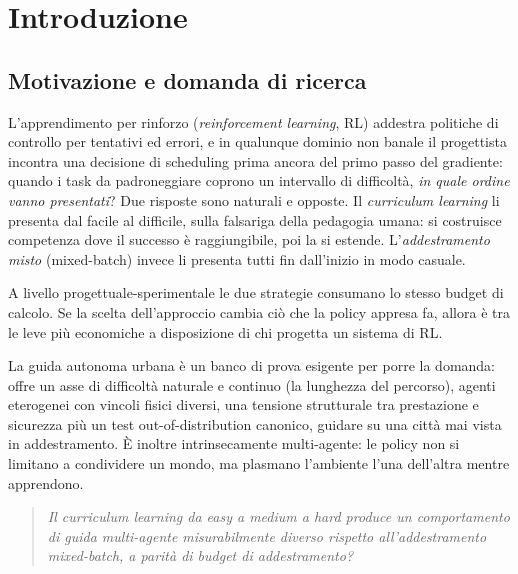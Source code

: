 \chapter{Introduzione}
\label{ch:intro}

\section{Motivazione e domanda di ricerca}
\label{sec:motivazione}

L'apprendimento per rinforzo (\emph{reinforcement learning}, RL)
addestra politiche di controllo per tentativi ed errori, e in qualunque
dominio non banale il progettista incontra una decisione di scheduling
prima ancora del primo passo del gradiente: quando i task da padroneggiare
coprono un intervallo di difficoltà, \emph{in quale ordine vanno
presentati}? Due risposte sono naturali e opposte. Il \emph{curriculum
learning} li presenta dal facile al difficile, sulla falsariga della
pedagogia umana: si costruisce competenza dove il successo è
raggiungibile, poi la si estende. L'\emph{addestramento misto}
(mixed-batch) invece li presenta tutti fin dall'inizio in modo casuale.

A livello progettuale-sperimentale le due strategie consumano lo stesso 
budget di calcolo. Se la scelta dell'approccio cambia ciò che la
policy appresa fa, allora è tra le leve più economiche a disposizione di
chi progetta un sistema di RL.

La guida autonoma urbana è un banco di prova esigente per porre la
domanda: offre un asse di difficoltà naturale e continuo (la lunghezza
del percorso), agenti eterogenei con vincoli fisici diversi, una
tensione strutturale tra prestazione e sicurezza più un test
out-of-distribution canonico, guidare su una città mai vista in
addestramento. È inoltre intrinsecamente multi-agente: le policy non si
limitano a condividere un mondo, ma plasmano l'ambiente l'una
dell'altra mentre apprendono.

\begin{quote}
  \emph{Il curriculum learning da easy a medium a hard produce un
  comportamento di guida multi-agente misurabilmente diverso rispetto
  all'addestramento mixed-batch, a parità di budget di addestramento?}
\end{quote}

